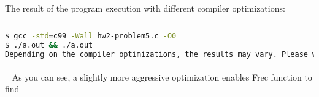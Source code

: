 \documentclass{article}
\begin{document}
		
	\rmfamily
	\noindent The result of the program execution with different compiler optimizations:
	
	\ttfamily
	\begin{lstlisting}[language=bash]
	
$ gcc -std=c99 -Wall hw2-problem5.c -O0
$ ./a.out && ./a.out
Depending on the compiler optimizations, the results may vary. Please wait...

	\end{lstlisting}
	

	\paragraph{}\
	\rmfamily
	As you can see, a slightly more aggressive optimization enables Frec function to find
		
\end{document}
